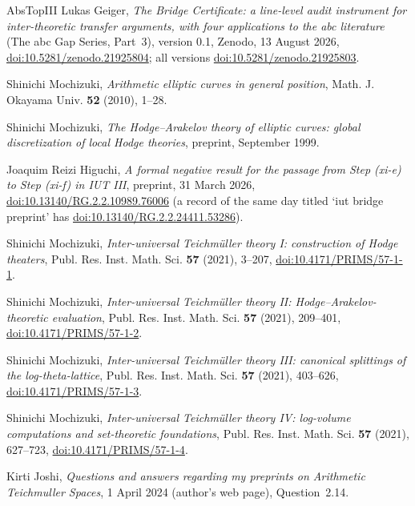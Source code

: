 \documentclass[11pt,a4paper]{article}
\numberwithin{table}{section}
\theoremstyle{plain}
\theoremstyle{definition}
\begin{document}
\begin{thebibliography}{AbsTopIII}
Lukas Geiger, \emph{The {B}ridge {C}ertificate: a line-level audit instrument for inter-theoretic transfer arguments,
with four applications to the abc literature} (The abc Gap Series, Part~3), version 0.1, Zenodo, 13 August 2026,
\href{https://doi.org/10.5281/zenodo.21925804}{doi:10.5281/zenodo.21925804}; all versions
\href{https://doi.org/10.5281/zenodo.21925803}{doi:10.5281/zenodo.21925803}.

Shinichi Mochizuki, \emph{Arithmetic elliptic curves in general position}, Math. J. Okayama Univ. \textbf{52} (2010),
1--28.

Shinichi Mochizuki, \emph{The {H}odge--{A}rakelov theory of elliptic curves: global discretization of local {H}odge
theories}, preprint, September 1999.

Joaquim Reizi Higuchi, \emph{A formal negative result for the passage from {S}tep (xi-e) to {S}tep (xi-f) in {IUT}
{III}}, preprint, 31 March 2026, \href{https://doi.org/10.13140/RG.2.2.10989.76006}{doi:10.13140/RG.2.2.10989.76006}
(a record of the same day titled `iut bridge preprint' has
\href{https://doi.org/10.13140/RG.2.2.24411.53286}{doi:10.13140/RG.2.2.24411.53286}).

Shinichi Mochizuki, \emph{Inter-universal {T}eichm\"uller theory {I}: construction of {H}odge theaters}, Publ. Res.
Inst. Math. Sci. \textbf{57} (2021), 3--207, \href{https://doi.org/10.4171/PRIMS/57-1-1}{doi:10.4171/PRIMS/57-1-1}.

Shinichi Mochizuki, \emph{Inter-universal {T}eichm\"uller theory {II}: {H}odge--{A}rakelov-theoretic evaluation}, Publ.
Res. Inst. Math. Sci. \textbf{57} (2021), 209--401, \href{https://doi.org/10.4171/PRIMS/57-1-2}{doi:10.4171/PRIMS/57-1-2}.

Shinichi Mochizuki, \emph{Inter-universal {T}eichm\"uller theory {III}: canonical splittings of the log-theta-lattice},
Publ. Res. Inst. Math. Sci. \textbf{57} (2021), 403--626,
\href{https://doi.org/10.4171/PRIMS/57-1-3}{doi:10.4171/PRIMS/57-1-3}.

Shinichi Mochizuki, \emph{Inter-universal {T}eichm\"uller theory {IV}: log-volume computations and set-theoretic
foundations}, Publ. Res. Inst. Math. Sci. \textbf{57} (2021), 627--723,
\href{https://doi.org/10.4171/PRIMS/57-1-4}{doi:10.4171/PRIMS/57-1-4}.

Kirti Joshi, \emph{Questions and answers regarding my preprints on Arithmetic Teichmuller Spaces}, 1 April 2024
(author's web page), Question~2.14.


\end{thebibliography}
\end{document}
